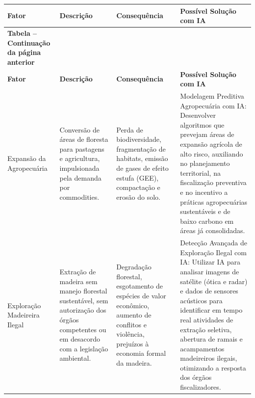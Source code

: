 \documentclass[12pt, a4paper, onecolumn, notitlepage]{article}
\begin{document}
    \begin{longtable}{@{} | >{\RaggedRight\arraybackslash}p{} | >{\RaggedRight\arraybackslash}p{} | >{\RaggedRight\arraybackslash}p{} | >{\RaggedRight\arraybackslash}p{} | @{}}
    \hline
    \textbf{Fator} & \textbf{Descrição} & \textbf{Consequência} & \textbf{Possível Solução com IA} \\
    \hline
    \endfirsthead

    \multicolumn{4}{c}%
    {{\bfseries Tabela \thetable{} -- Continuação da página anterior}} \\
    \hline
    \textbf{Fator} & \textbf{Descrição} & \textbf{Consequência} & \textbf{Possível Solução com IA} \\
    \hline
    \endhead

    \endfoot

    \hline
    \endlastfoot

    Expansão da Agropecuária &
    Conversão de áreas de floresta para pastagens e agricultura, impulsionada pela demanda por commodities. &
    Perda de biodiversidade, fragmentação de habitats, emissão de gases de efeito estufa (GEE), compactação e erosão do solo. &
    Modelagem Preditiva Agropecuária com IA: Desenvolver algoritmos que prevejam áreas de expansão agrícola de alto risco, auxiliando no planejamento territorial, na fiscalização preventiva e no incentivo a práticas agropecuárias sustentáveis e de baixo carbono em áreas já consolidadas. \\
    \hline

    Exploração Madeireira Ilegal &
    Extração de madeira sem manejo florestal sustentável, sem autorização dos órgãos competentes ou em desacordo com a legislação ambiental. &
    Degradação florestal, esgotamento de espécies de valor econômico, aumento de conflitos e violência, prejuízos à economia formal da madeira. &
    Detecção Avançada de Exploração Ilegal com IA: Utilizar IA para analisar imagens de satélite (ótica e radar) e dados de sensores acústicos para identificar em tempo real atividades de extração seletiva, abertura de ramais e acampamentos madeireiros ilegais, otimizando a resposta dos órgãos fiscalizadores. \\
    \hline


\end{longtable}
\end{document}
